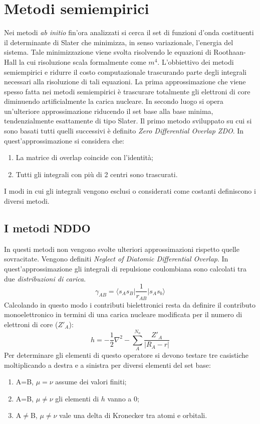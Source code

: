 \documentclass[oneside]{amsbook}
\numberwithin{section}{chapter}
\numberwithin{equation}{section}
\numberwithin{figure}{section}
\begin{document}
\chapter{Metodi semiempirici}\label{semi}
Nei metodi \emph{ab initio} fin'ora analizzati si cerca il set di funzioni d'onda costituenti il determinante di Slater che minimizza, in senso variazionale, l'energia del sistema. Tale minimizzazione viene svolta risolvendo le equazioni di Roothaan-Hall la cui risoluzione scala formalmente come $m^4$. L'obbiettivo dei metodi semiempirici e ridurre il costo computazionale trascurando parte degli integrali necessari alla risoluzione di tali equazioni.
La prima approssimazione che viene spesso fatta nei metodi semiempirici è trascurare totalmente gli elettroni di core diminuendo artificialmente la carica nucleare. In secondo luogo si opera un'ulteriore approssimazione riducendo il set base alla base minima, tendenzialmente esattamente di tipo Slater.
Il primo metodo sviluppato su cui si sono basati tutti quelli successivi è definito \emph{Zero Differential Overlap ZDO}.
In quest'approssimazione si considera che:
\begin{enumerate}
\item La matrice di overlap coincide con l'identità;
\item Tutti gli integrali con più di 2 centri sono trascurati.
\end{enumerate}
I modi in cui gli integrali vengono esclusi o considerati come costanti definiscono i diversi metodi. 
\section{I metodi NDDO}
In questi metodi non vengono svolte ulteriori approssimazioni rispetto quelle sovracitate. Vengono definiti \emph{Neglect of Diatomic Differential Overlap}.
In quest'approssimazione gli integrali di repulsione coulombiana sono calcolati tra due \emph{distribuzioni di carica}.
\begin{equation}
\gamma_{AB} =\langle s_As_B \vert \frac{1}{r_{AB}}\vert s_As_b \rangle
\end{equation}
Calcolando in questo modo i contributi bielettronici resta da definire il contributo monoelettronico in termini di una carica nucleare modificata per il numero di elettroni di core ($Z'_A$):
\begin{equation}
h=-\frac{1}{2}\nabla^2 -\sum \limits _A^{N_n} \frac{Z'_A}{\vert R_A -r \vert}
\end{equation}
Per determinare gli elementi di questo operatore si devono testare tre casistiche moltiplicando a destra e a sinistra per diversi elementi del set base:
\begin{enumerate}
\item A=B, $\mu=\nu$ assume dei valori finiti;
\item A=B, $\mu\neq\nu$ gli elementi di $h$ vanno a $0$;
\item A$\neq$B, $\mu\neq\nu$ vale una delta di Kronecker tra atomi e orbitali.
\end{enumerate}
\end{document}
